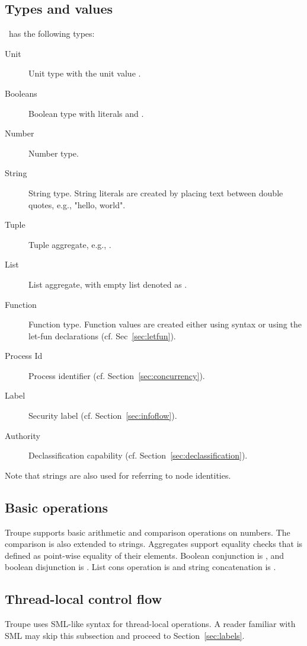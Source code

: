\subsection{Types and values}
\troupelang\ has the following types:
\begin{description}
\item [Unit] Unit type with the unit value \textcode{()}.
\item [Booleans] Boolean type with literals  and .
\item [Number] Number type.
\item [String] String type. String literals are created by placing text between double quotes, e.g., "hello, world".
\item [Tuple] Tuple aggregate, e.g., .
\item [List] List aggregate, with empty list denoted as \textcode{[]}.
\item [Function] Function type. Function values are created either using  syntax or using the let-fun declarations (cf. Sec~\ref{sec:letfun}).
\item [Process Id] Process identifier (cf. Section~\ref{sec:concurrency}).
\item [Label] Security label (cf. Section~\ref{sec:infoflow}).
\item [Authority] Declassification capability (cf. Section~\ref{sec:declassification}).
\end{description}
Note that strings are also used for referring to node identities.


\subsection{Basic operations}
Troupe supports basic arithmetic and comparison operations on numbers. The comparison is also extended to strings. 
Aggregates support equality checks that is defined as point-wise equality of their elements. Boolean conjunction is 
, and boolean disjunction is . List cons operation is \textcode{::} and 
string concatenation is {\textcode{\^{}}}.

\subsection{Thread-local control flow}
Troupe uses SML-like syntax for thread-local operations. A reader familiar
with SML may skip this subsection and proceed to  Section~\ref{sec:labels}.

